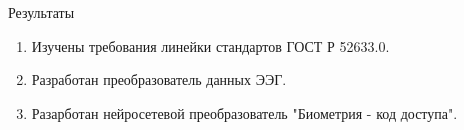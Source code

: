 \begin{frame}{Результаты}
	\begin{enumerate}
		\item Изучены требования линейки стандартов ГОСТ Р 52633.0.
        \item Разработан преобразователь данных ЭЭГ.
        \item Разарботан нейросетевой преобразователь "Биометрия - код доступа".
	\end{enumerate}
\end{frame}

